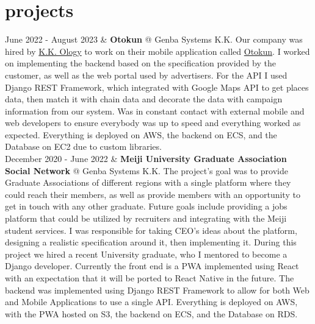 \documentclass[]{cv-roald}
\begin{document}
\section*{projects}
\begin{tabularcv}
    June 2022 - August 2023 &       \textbf{Otokun} @ Genba Systems K.K.\newline 
                                Our company was hired by \href{https://www.ology.co.jp/}{K.K. Ology} to work on their mobile application called \href{https://www.otokun.jp/}{Otokun}. I worked on implementing the backend based on the specification provided by the customer, as well as the web portal used by advertisers. For the API I used Django REST Framework, which integrated with Google Maps API to get places data, then match it with chain data and decorate the data with campaign information from our system. Was in constant contact with external mobile and web developers to ensure everybody was up to speed and everything worked as expected.
                                \newline Everything is deployed on AWS, the backend on ECS, and the Database on EC2 due to custom libraries. 
                                \\[\vspacepar]
    December 2020 - June 2022 &       \textbf{Meiji University Graduate Association Social Network} @ Genba Systems K.K.\newline 
                                The project's goal was to provide Graduate Associations of different regions with a single platform where they could reach their members, as well as provide members with an opportunity to get in touch with any other graduate. Future goals include providing a jobs platform that could be utilized by recruiters and integrating with the Meiji student services. I was responsible for taking CEO's ideas about the platform, designing a realistic specification around it, then implementing it. During this project we hired a recent University graduate, who I mentored to become a Django developer.  
                                \newline Currently the front end is a PWA implemented using React with an expectation that it will be ported to React Native in the future. The backend was implemented using Django REST Framework to allow for both Web and Mobile Applications to use a single API. Everything is deployed on AWS, with the PWA hosted on S3, the backend on ECS, and the Database on RDS.
                                \\[\vspacepar]

\end{tabularcv}
\end{document}
